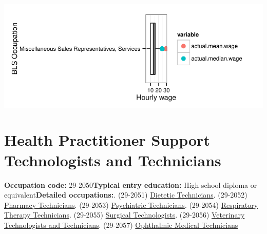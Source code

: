 \documentclass[a4paper,10pt]{article}\usepackage[]{graphicx}\usepackage[]{color}
\makeatletter
\def\maxwidth{ %
  \ifdim\Gin@nat@width>\linewidth
    \linewidth
  \else
    \Gin@nat@width
  \fi
}
\makeatother
\begin{document}
{\centering \includegraphics[width=\maxwidth]{figure/unnamed-chunk-242} 

}


\newpage\section{Health Practitioner Support Technologists and Technicians}\textbf{Occupation code:} 29-2050\newline\textbf{Typical entry education:} High school diploma or equivalent\newline\textbf{Detailed occupations:}. (29-2051)  \href{http://www.bls.gov/oes/current/oes292051.htm}{Dietetic Technicians}. (29-2052)  \href{http://www.bls.gov/oes/current/oes292052.htm}{Pharmacy Technicians}. (29-2053)  \href{http://www.bls.gov/oes/current/oes292053.htm}{Psychiatric Technicians}. (29-2054)  \href{http://www.bls.gov/oes/current/oes292054.htm}{Respiratory Therapy Technicians}. (29-2055)  \href{http://www.bls.gov/oes/current/oes292055.htm}{Surgical Technologists}. (29-2056)  \href{http://www.bls.gov/oes/current/oes292056.htm}{Veterinary Technologists and Technicians}. (29-2057)  \href{http://www.bls.gov/oes/current/oes292057.htm}{Ophthalmic Medical Technicians}\newline%
\end{document}
